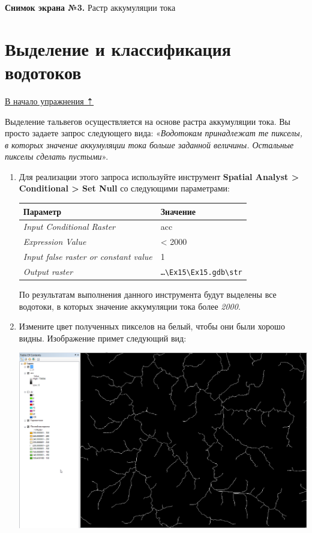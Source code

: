 \documentclass[]{book}
\theoremstyle{definition}
\theoremstyle{definition}
\theoremstyle{definition}
\theoremstyle{remark}
\begin{document}
\textbf{Снимок экрана №3.} Растр аккумуляции тока

\hypertarget{dem-classify}{%
\section{Выделение и классификация водотоков}\label{dem-classify}}

\protect\hyperlink{dem}{В начало упражнения ⇡}

Выделение тальвегов осуществляется на основе растра аккумуляции тока. Вы
просто задаете запрос следующего вида: «\emph{Водотокам принадлежат те
пикселы, в которых значение аккумуляции тока больше заданной величины.
Остальные пикселы сделать пустыми}».

\begin{enumerate}
\def\labelenumi{\arabic{enumi}.}
\item
  Для реализации этого запроса используйте инструмент \textbf{Spatial
  Analyst \textgreater{} Conditional \textgreater{} Set Null} со
  следующими параметрами:

  \begin{longtable}[]{@{}ll@{}}
  \toprule
  Параметр & Значение\tabularnewline
  \midrule
  \endhead
  \emph{Input Conditional Raster} & acc\tabularnewline
  \emph{Expression Value} & \textless{} 2000\tabularnewline
  \emph{Input false raster or constant value} & 1\tabularnewline
  \emph{Output raster} &
  \texttt{\ldots{}\textbackslash{}Ex15\textbackslash{}Ex15.gdb\textbackslash{}str}\tabularnewline
  \bottomrule
  \end{longtable}

  По результатам выполнения данного инструмента будут выделены все
  водотоки, в которых значение аккумуляции тока более \emph{2000}.
\item
  Измените цвет полученных пикселов на белый, чтобы они были хорошо
  видны. Изображение примет следующий вид:

  \includegraphics{images/Ex15/image14.png}


\end{enumerate}
\end{document}
